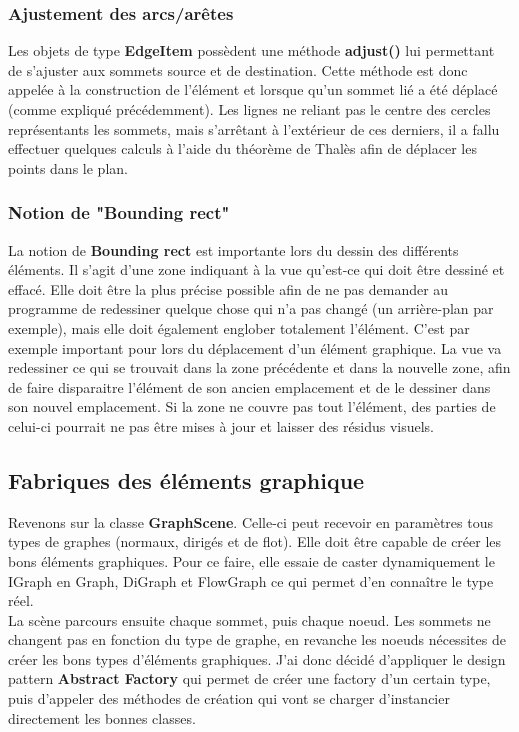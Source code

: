 \documentclass[french]{article}
\begin{document}
			\subsubsection{Ajustement des arcs/arêtes}
				Les objets de type \textbf{EdgeItem} possèdent une méthode \textbf{adjust()} lui permettant de s'ajuster aux sommets source et de destination. Cette méthode est donc appelée à la construction de l'élément et lorsque qu'un sommet lié a été déplacé (comme expliqué précédemment). Les lignes ne reliant pas le centre des cercles représentants les sommets, mais s'arrêtant à l'extérieur de ces derniers, il a fallu effectuer quelques calculs à l'aide du théorème de Thalès afin de déplacer les points dans le plan.
				
			\subsubsection{Notion de "Bounding rect"}
				La notion de \textbf{Bounding rect} est importante lors du dessin des différents éléments. Il s'agit d'une zone indiquant à la vue qu'est-ce qui doit être dessiné et effacé. Elle doit être la plus précise possible afin de ne pas demander au programme de redessiner quelque chose qui n'a pas changé (un arrière-plan par exemple), mais elle doit également englober totalement l'élément. C'est par exemple important pour lors du déplacement d'un élément graphique. La vue va redessiner ce qui se trouvait dans la zone précédente et dans la nouvelle zone, afin de faire disparaitre l'élément de son ancien emplacement et de le dessiner dans son nouvel emplacement. Si la zone ne couvre pas tout l'élément, des parties de celui-ci pourrait ne pas être mises à jour et laisser des résidus visuels.
			
		\subsection{Fabriques des éléments graphique}
			Revenons sur la classe \textbf{GraphScene}. Celle-ci peut recevoir en paramètres tous types de graphes (normaux, dirigés et de flot). Elle doit être capable de créer les bons éléments graphiques. Pour ce faire, elle essaie de caster dynamiquement le IGraph en Graph, DiGraph et FlowGraph ce qui permet d'en connaître le type réel. \\
			
			La scène parcours ensuite chaque sommet, puis chaque noeud. Les sommets ne changent pas en fonction du type de graphe, en revanche les noeuds nécessites de créer les bons types d'éléments graphiques. J'ai donc décidé d'appliquer le design pattern \textbf{Abstract Factory} qui permet de créer une factory d'un certain type, puis d'appeler des méthodes de création qui vont se charger d'instancier directement les bonnes classes.
			
\end{document}
